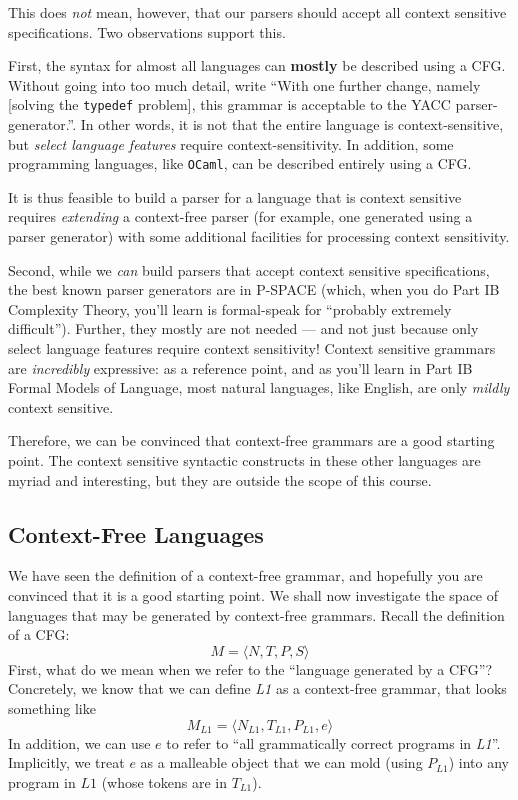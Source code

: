 This does \textit{not} mean, however, that our parsers should accept all context sensitive specifications. Two observations support this.

First, the syntax for almost all languages can \textbf{mostly} be described using a CFG. Without going into too much detail, \citet{kernighan-1978} write ``With one further change, namely [solving the \texttt{typedef} problem], this grammar is acceptable to the YACC parser-generator.''. In other words, it is not that the entire language is context-sensitive, but \textit{select language features} require context-sensitivity. In addition, some programming languages, like \texttt{OCaml}, can be described entirely using a CFG.

It is thus feasible to build a parser for a language that is context sensitive requires \textit{extending} a context-free parser (for example, one generated using a parser generator) with some additional facilities for processing context sensitivity. 

Second, while we \textit{can} build parsers that accept context sensitive specifications, the best known parser generators are in \textsf{P-SPACE} (which, when you do \textsf{Part IB Complexity Theory}, you'll learn is formal-speak for ``probably extremely difficult''). Further, they mostly are not needed --- and not just because only select language features require context sensitivity! Context sensitive grammars are \textit{incredibly} expressive: as a reference point, and as you'll learn in \textsf{Part IB Formal Models of Language}, most natural languages, like English, are only \textit{mildly} context sensitive.

Therefore, we can be convinced that context-free grammars are a good starting point. The context sensitive syntactic constructs in these other languages are myriad and interesting, but they are outside the scope of this course.

\subsection{Context-Free Languages}\label{section:cfg-properties}
We have seen the definition of a context-free grammar, and hopefully you are convinced that it is a good starting point. We shall now investigate the space of languages that may be generated by context-free grammars. Recall the definition of a CFG:
\[ M = \langle N, T, P, S \rangle \]
First, what do we mean when we refer to the ``language generated by a CFG''? Concretely, we know that we can define \textit{L1} as a context-free grammar, that looks something like
\[ M_{\textit{L1}} = \langle N_{\textit{L1}}, T_{\textit{L1}}, P_{\textit{L1}}, e \rangle \]
In addition, we can use $e$ to refer to ``all grammatically correct programs in \textit{L1}''. Implicitly, we treat $e$ as a malleable object that we can mold (using $P_{\textit{L1}}$) into any program in $L1$ (whose tokens are in $T_{\textit{L1}}$). 

